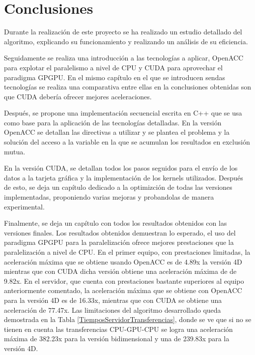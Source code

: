 \chapter{Conclusiones}

Durante la realización de este proyecto se ha realizado un estudio detallado del algoritmo, explicando su funcionamiento y realizando un análisis de su eficiencia.

Seguidamente se realiza una introducción a las tecnologías a aplicar, OpenACC para explotar el paralelismo a nivel de CPU y CUDA para aprovechar el paradigma GPGPU. En el mismo capítulo en el que se introducen sendas tecnologías se realiza una comparativa entre ellas en la conclusiones obtenidas son que CUDA debería ofrecer mejores aceleraciones.

Después, se propone una implementación secuencial escrita en C++ que se usa como base para la aplicación de las tecnologías detalladas. En la versión OpenACC se detallan las directivas a utilizar y se plantea el problema y la solución del acceso a la variable en la que se acumulan los resultados en exclusión mutua.

En la versión CUDA, se detallan todos los pasos seguidos para el envío de los datos a la tarjeta gráfica y la implementación de los kernels utilizados. Después de esto, se deja un capítulo dedicado a la optimizción de todas las versiones implementadas, proponiendo varias mejoras y probandolas de manera experimental.

Finalmente, se deja un capítulo con todos los resultados obtenidos con las versiones finales. Los resultados obtenidos demuestran lo esperado, el uso del paradigma GPGPU para la paralelización ofrece mejores prestaciones que la paralelización a nivel de CPU. En el primer equipo, con prestaciones limitadas, la aceleración máxima que se obtiene usando OpenACC es de 4.89x la versión 4D mientras que con CUDA dicha versión obtiene una aceleración máxima de de 9.82x. En el servidor, que cuenta con prestaciones bastante superiores al equipo anteriormente comentado, la aceleración máxima que se obtiene con OpenACC para la versión 4D es de 16.33x, mientras que con CUDA se obtiene una aceleración de 77.47x. Las limitaciones del algoritmo desarrollado queda demostrada en la Tabla \ref{TiemposServidorTransferencias}, donde se ve que si no se tienen en cuenta las transferencias CPU-GPU-CPU se logra una aceleración máxima de 382.23x para la versión bidimensional y una de 239.83x para la versión 4D.